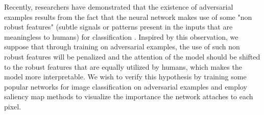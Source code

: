 \documentclass[../main.tex]{subfiles}
\begin{document}
Recently, researchers have demonstrated that the existence of adversarial examples results from the fact that the neural network makes use of some "non robust features" (subtle signals or patterns present in the inputs that are meaningless to humans) for classification \cite{ilyas_adversarial_2019}. Inspired by this observation, we suppose that through training on adversarial examples, the use of such non robust features will be penalized and the attention of the model should be shifted to the robust features that are equally utilized by humans, which makes the model more interpretable. We wish to verify this hypothesis by training some popular networks for image classification on adversarial examples and employ saliency map methods to visualize the importance the network attaches to each pixel. 



\end{document}
